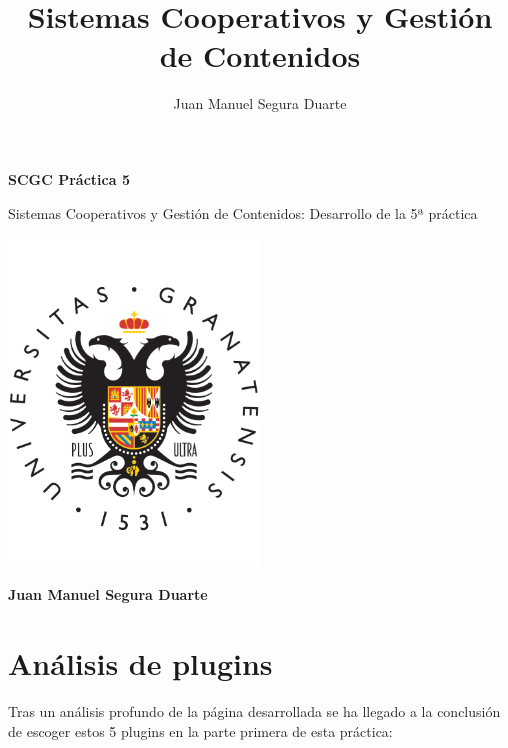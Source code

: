 \documentclass[a4paper]{article}
\title{Sistemas Cooperativos y Gestión de Contenidos}
\author{Juan Manuel Segura Duarte}
\begin{document}
\begin{titlepage}
    \centering
    \vspace*{3cm}  %
    {\Huge \textbf{SCGC Práctica 5}} %
    \vspace{1cm}
    
    {\Large Sistemas Cooperativos y Gestión de Contenidos: Desarrollo de la 5ª práctica} %
    
    \includegraphics[width=0.5\textwidth]{images/ugr-logo.png}
    \vspace{1cm}
    
    \textbf{\Large Juan Manuel Segura Duarte} %
\end{titlepage}
\newpage

\thispagestyle{empty}
\tableofcontents


\newpage
{}
\setcounter{page}{1}


\section{Análisis de plugins}

Tras un análisis profundo de la página desarrollada se ha llegado a la conclusión de escoger estos 5 plugins en la parte primera de esta práctica:
\end{document}
